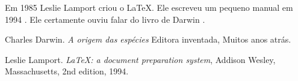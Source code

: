 \documentclass[a5paper,article]{memoir}
\begin{document}
Em 1985 Leslie Lamport criou o \LaTeX.
Ele escreveu um pequeno manual em 1994 \cite{lamport94}.
Ele certamente ouviu falar do
livro de Darwin \cite{darwin}.

\begin{thebibliography}{9}

  Charles Darwin.
  \emph{A origem das espécies}
  Editora inventada,
  Muitos anos atrás.

  Leslie Lamport.
  \emph{\LaTeX: a document preparation system},
  Addison Wesley, Massachusetts,
  2nd edition,
  1994.
  
\end{thebibliography}
\end{document}
